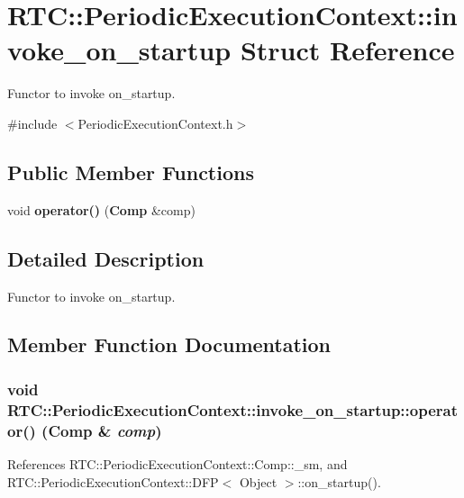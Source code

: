\section{RTC::PeriodicExecutionContext::invoke\_\-on\_\-startup Struct Reference}
\label{structRTC_1_1PeriodicExecutionContext_1_1invoke__on__startup}


Functor to invoke on\_\-startup.  




{\ttfamily \#include $<$PeriodicExecutionContext.h$>$}

\subsection*{Public Member Functions}
\begin{DoxyCompactItemize}
\item 
void {\bf operator()} ({\bf Comp} \&comp)
\end{DoxyCompactItemize}


\subsection{Detailed Description}
Functor to invoke on\_\-startup. 

\subsection{Member Function Documentation}
\subsubsection[{operator()}]{\setlength{\rightskip}{0pt plus 5cm}void RTC::PeriodicExecutionContext::invoke\_\-on\_\-startup::operator() ({\bf Comp} \& {\em comp})\hspace{0.3cm}{\ttfamily  [inline]}}\label{structRTC_1_1PeriodicExecutionContext_1_1invoke__on__startup_adda237953995471a223c0ec6123205e1}


References RTC::PeriodicExecutionContext::Comp::\_\-sm, and RTC::PeriodicExecutionContext::DFP$<$ Object $>$::on\_\-startup().

